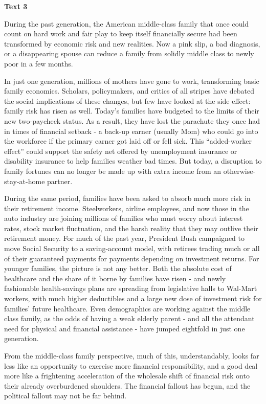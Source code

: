\begin{center}\textbf{Text 3}\end{center}

\qquad During the past generation, the American middle-class family that once could count on hard work and fair play to keep itself financially secure had been transformed by economic risk and new realities. Now a pink slip, a bad diagnosis, or a disappearing spouse can reduce a family from solidly middle class to newly poor in a few months.

\qquad In just one generation, millions of mothers have gone to work, transforming basic family economics. Scholars, policymakers, and critics of all stripes have debated the social implications of these changes, but few have looked at the side effect: family risk has risen as well. Today’s families have budgeted to the limits of their new two-paycheck status. As a result, they have lost the parachute they once had in times of financial setback - a back-up earner (usually Mom) who could go into the workforce if the primary earner got laid off or fell sick. This “added-worker effect” could support the safety net offered by unemployment insurance or disability insurance to help families weather bad times. But today, a disruption to family fortunes can no longer be made up with extra income from an otherwise-stay-at-home partner.

\qquad During the same period, families have been asked to absorb much more risk in their retirement income. Steelworkers, airline employees, and now those in the auto industry are joining millions of families who must worry about interest rates, stock market fluctuation, and the harsh reality that they may outlive their retirement money. For much of the past year, President Bush campaigned to move Social Security to a saving-account model, with retirees trading much or all of their guaranteed payments for payments depending on investment returns. For younger families, the picture is not any better. Both the absolute cost of healthcare and the share of it borne by families have risen - and newly fashionable health-savings plans are spreading from legislative halls to Wal-Mart workers, with much higher deductibles and a large new dose of investment risk for families’ future healthcare. Even demographics are working against the middle class family, as the odds of having a weak elderly parent - and all the attendant need for physical and financial assistance - have jumped eightfold in just one generation.

\qquad From the middle-class family perspective, much of this, understandably, looks far less like an opportunity to exercise more financial responsibility, and a good deal more like a frightening acceleration of the wholesale shift of financial risk onto their already overburdened shoulders. The financial fallout has begun, and the political fallout may not be far behind.

